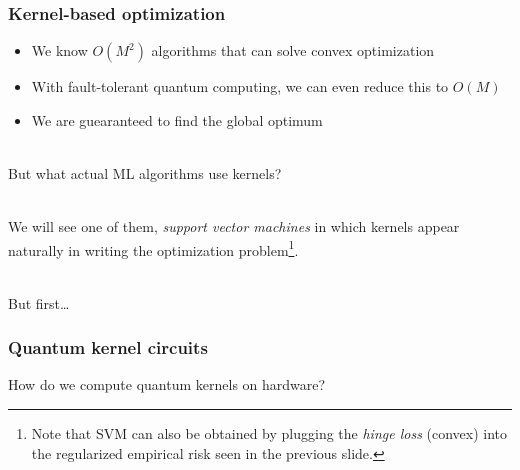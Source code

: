 \documentclass[aspectratio=43]{beamer}
\begin{document}
\begin{frame}
  \frametitle{Kernel-based optimization}

  \begin{itemize}
    \item We know $O(M^2)$ algorithms that can solve convex optimization
    \item With fault-tolerant quantum computing, we can even reduce this to $O(M)$
    \item We are guearanteed to find the global optimum
  \end{itemize}

  \ \\
  But what actual ML algorithms use kernels? 
  
  \ \\
  We will see one of them, \emph{support vector machines} in which kernels appear naturally in writing the optimization problem\footnote{Note that SVM can also be obtained by plugging the \emph{hinge loss} (convex) into the regularized empirical risk seen in the previous slide.}.

  \ \\
  But first\dots

\end{frame}


\begin{frame}
  \frametitle{Quantum kernel circuits}

  How do we compute quantum kernels on hardware?

\end{frame}

\end{document}
